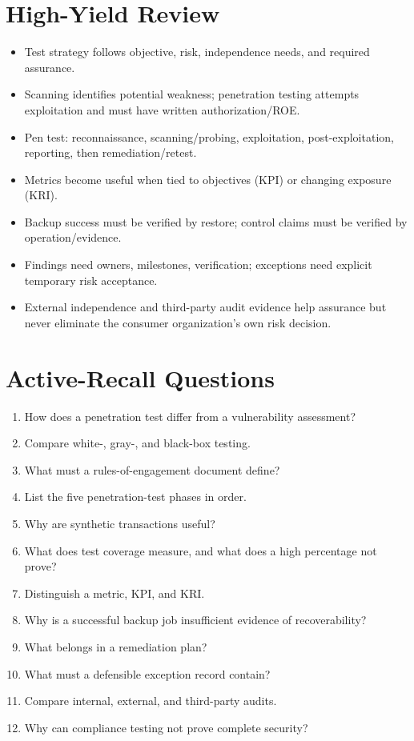 \documentclass[10pt,letterpaper]{article}
\begin{document}
\section{\color{navy}High-Yield Review}
\begin{itemize}
\item Test strategy follows objective, risk, independence needs, and required assurance.
\item Scanning identifies potential weakness; penetration testing attempts exploitation and must have written authorization/ROE.
\item Pen test: reconnaissance, scanning/probing, exploitation, post-exploitation, reporting, then remediation/retest.
\item Metrics become useful when tied to objectives (KPI) or changing exposure (KRI).
\item Backup success must be verified by restore; control claims must be verified by operation/evidence.
\item Findings need owners, milestones, verification; exceptions need explicit temporary risk acceptance.
\item External independence and third-party audit evidence help assurance but never eliminate the consumer organization's own risk decision.
\end{itemize}

\section{\color{navy}Active-Recall Questions}
\begin{enumerate}
\item How does a penetration test differ from a vulnerability assessment?
\item Compare white-, gray-, and black-box testing.
\item What must a rules-of-engagement document define?
\item List the five penetration-test phases in order.
\item Why are synthetic transactions useful?
\item What does test coverage measure, and what does a high percentage not prove?
\item Distinguish a metric, KPI, and KRI.
\item Why is a successful backup job insufficient evidence of recoverability?
\item What belongs in a remediation plan?
\item What must a defensible exception record contain?
\item Compare internal, external, and third-party audits.
\item Why can compliance testing not prove complete security?
\end{enumerate}
\end{document}
